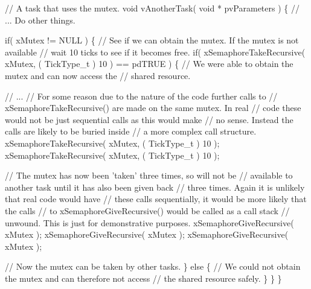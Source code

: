 \begin{DoxyPre}// A task that uses the mutex.
void vAnotherTask( void * pvParameters )
\{
   // ... Do other things.\end{DoxyPre}



\begin{DoxyPre}   if( xMutex != NULL )
   \{
       // See if we can obtain the mutex.  If the mutex is not available
       // wait 10 ticks to see if it becomes free.
       if( xSemaphoreTakeRecursive( xMutex, ( TickType\_t ) 10 ) == pdTRUE )
       \{
           // We were able to obtain the mutex and can now access the
           // shared resource.\end{DoxyPre}



\begin{DoxyPre}           // ...
           // For some reason due to the nature of the code further calls to
        // xSemaphoreTakeRecursive() are made on the same mutex.  In real
        // code these would not be just sequential calls as this would make
        // no sense.  Instead the calls are likely to be buried inside
        // a more complex call structure.
           xSemaphoreTakeRecursive( xMutex, ( TickType\_t ) 10 );
           xSemaphoreTakeRecursive( xMutex, ( TickType\_t ) 10 );\end{DoxyPre}



\begin{DoxyPre}           // The mutex has now been 'taken' three times, so will not be
        // available to another task until it has also been given back
        // three times.  Again it is unlikely that real code would have
        // these calls sequentially, it would be more likely that the calls
        // to xSemaphoreGiveRecursive() would be called as a call stack
        // unwound.  This is just for demonstrative purposes.
           xSemaphoreGiveRecursive( xMutex );
        xSemaphoreGiveRecursive( xMutex );
        xSemaphoreGiveRecursive( xMutex );\end{DoxyPre}



\begin{DoxyPre}        // Now the mutex can be taken by other tasks.
       \}
       else
       \{
           // We could not obtain the mutex and can therefore not access
           // the shared resource safely.
       \}
   \}
\}
\end{DoxyPre}
 